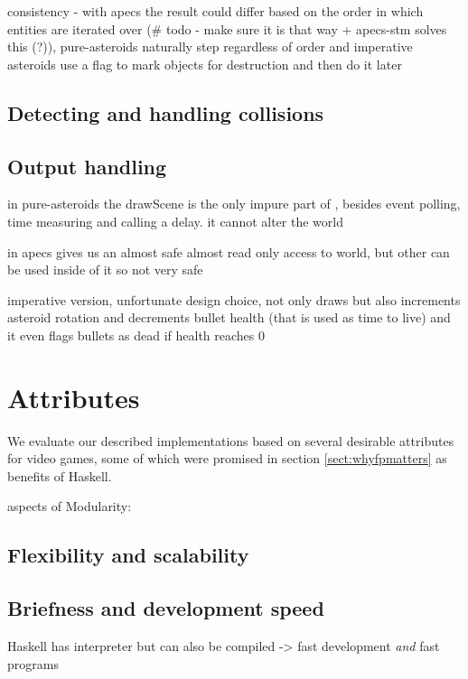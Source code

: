 \documentclass[
  digital, %
  color,   %
  table,   %
  oneside, %
  lof,     %
  lot,     %
]{fithesis3}
\begin{document}
{consistency - with apecs the result could differ based on the order in which
entities are iterated over (\# todo - make sure it is that way + apecs-stm solves this (?)),
pure-asteroids naturally step regardless of order and imperative asteroids use a flag to mark
objects for destruction and then do it later

\subsection{Detecting and handling collisions}



\subsection{Output handling}

in pure-asteroids the drawScene is the only impure part of ,
besides event polling, time measuring and calling a delay. it cannot alter the world

in apecs  gives us an almost safe almost read only access to world,
but other  can be used inside of it so not very safe

imperative version, unfortunate design choice,  not only draws
but also increments asteroid rotation and decrements bullet health (that is used as time to live)
and it even flags bullets as dead if health reaches 0

\section{Attributes}
We evaluate our described implementations based on several desirable attributes for video games,
some of which were promised in section \ref{sect:whyfpmatters} as benefits of Haskell.

aspects of Modularity:
\subsection{Flexibility and scalability}


\subsection{Briefness and development speed}

Haskell has interpreter but can also be compiled -> fast development \emph{and} fast programs

}
\end{document}
